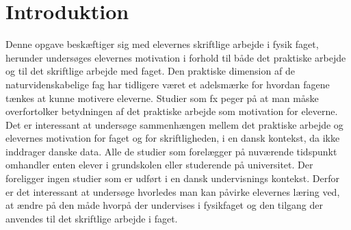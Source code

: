 \chapter{Introduktion}
\label{Ch:1}

Denne opgave beskæftiger sig med elevernes skriftlige arbejde i fysik faget, herunder undersøges elevernes motivation i forhold til både det praktiske arbejde og til det skriftlige arbejde med faget. Den praktiske dimension af de naturvidenskabelige fag har tidligere været et adelsmærke for hvordan fagene tænkes at kunne motivere eleverne. Studier som fx \citep{Hodson2008} peger på at man måske overfortolker betydningen af det praktiske arbejde som motivation for eleverne. Det er interessant at undersøge sammenhængen mellem det praktiske arbejde og elevernes motivation for faget og for skriftligheden, i en dansk kontekst, da \citep{Hodson2008} ikke inddrager danske data. Alle de studier som forelægger på nuværende tidspunkt omhandler enten elever i grundskolen eller studerende på universitet. Der foreligger ingen studier som er udført i en dansk undervisnings kontekst. Derfor er det interessant at undersøge hvorledes man kan påvirke elevernes læring ved, at ændre på den måde hvorpå der undervises i fysikfaget og den tilgang der anvendes til det skriftlige arbejde i faget. 

